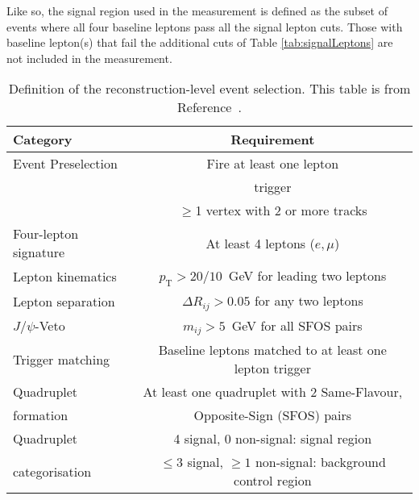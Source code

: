 Like so, the signal region used in the measurement is defined as the subset of events where all four baseline leptons pass all the signal lepton cuts. Those with baseline lepton(s) that fail the additional cuts of Table \ref{tab:signalLeptons} are not included in the measurement.
\begin{table}[ht]
    \centering
        \begin{tabular}{l | c }
            Category & Requirement \\
            \hline
            Event Preselection & Fire at least one lepton \\
                                & trigger \\
                               & $\geq$1 vertex with 2 or more tracks \\[0.2cm]
            \hline
               Four-lepton signature & At least 4 leptons ($e,\mu$)    \\ 
               Lepton kinematics   &   $p_{\text{T}} > 20 / 10$~GeV{} for
                                     leading two leptons \\[0.2cm]
               Lepton separation               &   $\Delta R_{ij} > 0.05$ for any two leptons \\
              $J/\psi$-Veto &    $  m_{ij} > 5$~GeV for all SFOS pairs \\
            \hline 
               Trigger matching   & Baseline leptons matched to at least one lepton trigger \\[0.2cm] 
            \hline
              Quadruplet & At least one quadruplet with 2 Same-Flavour, \\
              formation & Opposite-Sign (SFOS) pairs \\
            \hline
              Quadruplet &  4 signal, 0 non-signal: signal region \\
              categorisation    &  $\leq 3$ signal, $\geq 1$ non-signal: background control region \\
        \end{tabular}
        \caption{Definition of the reconstruction-level event selection. This table is from Reference~\cite{m4l_internalnote}.\label{tab:eventsel}}
\end{table}
